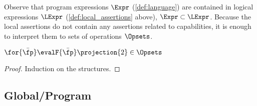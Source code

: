 Observe that program expressions $\Expr$  (\ref{def:language}) are contained in logical expressions $\LExpr$ (\ref{def:local_assertions} above), \ie $\Expr \subset \LExpr$. 
Because the local assertions do not contain any assertions related to capabilities, it is enough to interpret them to sets of operations \( \Opsets \).

\begin{lem}
\(
    \for{\bar{\fp}} \evalF{\bar{\fp}}\projection{2} \in \Opsets
\)
\end{lem}
\begin{proof}
Induction on the structures.
\end{proof}


\subsection{Global/Program}


